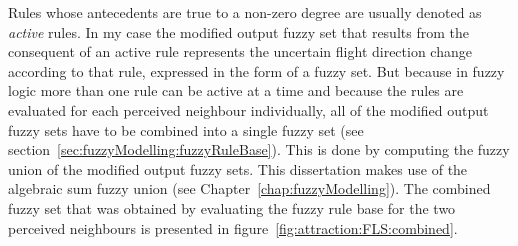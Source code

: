 Rules whose antecedents are true to a non-zero degree are usually denoted as \emph{active} rules. In my case the modified output fuzzy set that results from the consequent of an active rule represents the uncertain flight direction change according to that rule, expressed in the form of a fuzzy set. But because in fuzzy logic more than one rule can be active at a time and because the rules are evaluated for each perceived neighbour individually, all of the modified output fuzzy sets have to be combined into a single fuzzy set (see section~\ref{sec:fuzzyModelling:fuzzyRuleBase}). This is done by computing the fuzzy union of the modified output fuzzy sets. This dissertation makes use of the algebraic sum fuzzy union (see Chapter~\ref{chap:fuzzyModelling}). The combined fuzzy set that was obtained by evaluating the fuzzy rule base for the two perceived neighbours is presented in figure~\ref{fig:attraction:FLS:combined}. 

